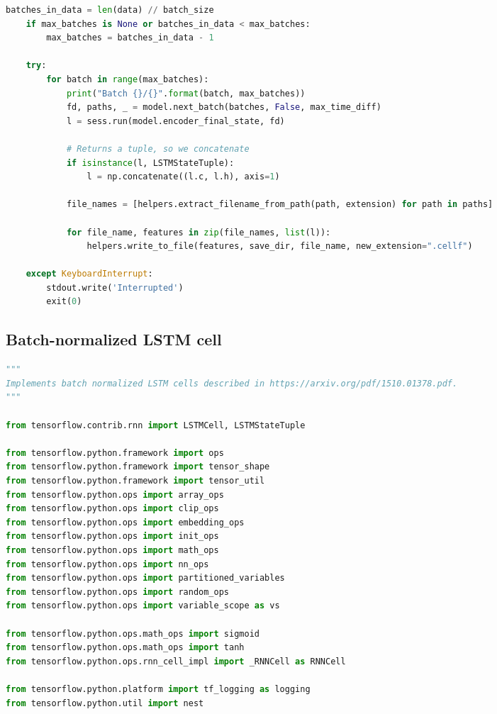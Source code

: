 \begin{landscape}
\begin{multicols}{2}
\begin{lstlisting}[language=Python]
    batches_in_data = len(data) // batch_size
    if max_batches is None or batches_in_data < max_batches:
        max_batches = batches_in_data - 1

    try:
        for batch in range(max_batches):
            print("Batch {}/{}".format(batch, max_batches))
            fd, paths, _ = model.next_batch(batches, False, max_time_diff)
            l = sess.run(model.encoder_final_state, fd)

            # Returns a tuple, so we concatenate
            if isinstance(l, LSTMStateTuple):
                l = np.concatenate((l.c, l.h), axis=1)

            file_names = [helpers.extract_filename_from_path(path, extension) for path in paths]

            for file_name, features in zip(file_names, list(l)):
                helpers.write_to_file(features, save_dir, file_name, new_extension=".cellf")

    except KeyboardInterrupt:
        stdout.write('Interrupted')
        exit(0)
\end{lstlisting}

\subsection{Batch-normalized LSTM cell}

\begin{lstlisting}[language=Python]
"""
Implements batch normalized LSTM cells described in https://arxiv.org/pdf/1510.01378.pdf.
"""

from tensorflow.contrib.rnn import LSTMCell, LSTMStateTuple

from tensorflow.python.framework import ops
from tensorflow.python.framework import tensor_shape
from tensorflow.python.framework import tensor_util
from tensorflow.python.ops import array_ops
from tensorflow.python.ops import clip_ops
from tensorflow.python.ops import embedding_ops
from tensorflow.python.ops import init_ops
from tensorflow.python.ops import math_ops
from tensorflow.python.ops import nn_ops
from tensorflow.python.ops import partitioned_variables
from tensorflow.python.ops import random_ops
from tensorflow.python.ops import variable_scope as vs

from tensorflow.python.ops.math_ops import sigmoid
from tensorflow.python.ops.math_ops import tanh
from tensorflow.python.ops.rnn_cell_impl import _RNNCell as RNNCell

from tensorflow.python.platform import tf_logging as logging
from tensorflow.python.util import nest


\end{lstlisting}
\end{multicols}
\end{landscape}
